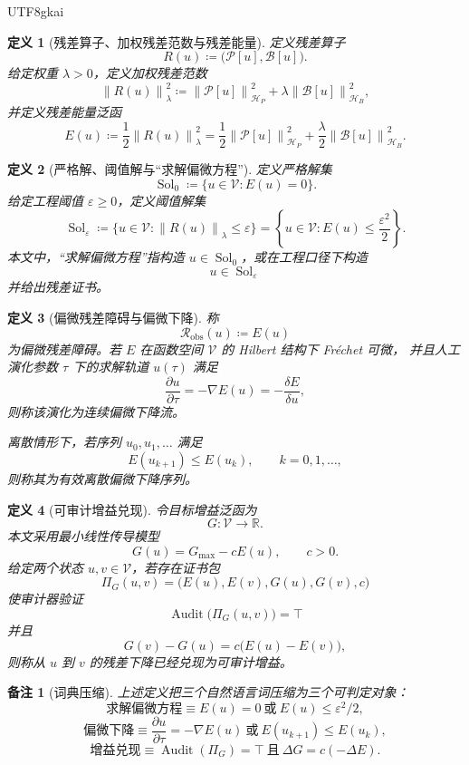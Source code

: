 \documentclass[12pt]{article}
\newtheorem{definition}{定义}[section]
\newtheorem{remark}{备注}[section]
\newcommand{\RR}{\mathbb{R}}
\newcommand{\DefEq}{\coloneqq}
\newcommand{\Pcal}{\mathcal P}
\newcommand{\Bcal}{\mathcal B}
\newcommand{\Vcal}{\mathcal V}
\newcommand{\Hcal}{\mathcal H}
\newcommand{\Rcal}{\mathcal R}
\newcommand{\norm}[1]{\left\lVert #1 \right\rVert}
\DeclareMathOperator{\Sol}{Sol}
\DeclareMathOperator{\Audit}{Audit}
\begin{document}
\begin{CJK*}{UTF8}{gkai}
\begin{definition}[残差算子、加权残差范数与残差能量]
\label{def:tex58-residual-energy}
定义残差算子
\[
  R(u)
  \DefEq
  \bigl(\Pcal[u],\Bcal[u]\bigr).
\]
给定权重 \(\lambda>0\)，定义加权残差范数
\[
  \norm{R(u)}_{\lambda}^{2}
  \DefEq
  \norm{\Pcal[u]}_{\Hcal_P}^{2}
  +
  \lambda\norm{\Bcal[u]}_{\Hcal_B}^{2},
\]
并定义残差能量泛函
\[
  E(u)
  \DefEq
  \frac12\norm{R(u)}_{\lambda}^{2}
  =
  \frac12\norm{\Pcal[u]}_{\Hcal_P}^{2}
  +
  \frac{\lambda}{2}\norm{\Bcal[u]}_{\Hcal_B}^{2}.
\]
\end{definition}

\begin{definition}[严格解、阈值解与“求解偏微方程”]
\label{def:tex58-solve-pde}
定义严格解集
\[
  \Sol_0
  \DefEq
  \{u\in\Vcal:E(u)=0\}.
\]
给定工程阈值 \(\varepsilon\ge0\)，定义阈值解集
\[
  \Sol_{\varepsilon}
  \DefEq
  \{u\in\Vcal:\norm{R(u)}_{\lambda}\le\varepsilon\}
  =
  \left\{u\in\Vcal:E(u)\le\frac{\varepsilon^2}{2}\right\}.
\]
本文中，“求解偏微方程”指构造 \(u\in\Sol_0\)，或在工程口径下构造
\[
  u\in\Sol_{\varepsilon}
\]
并给出残差证书。
\end{definition}

\begin{definition}[偏微残差障碍与偏微下降]
\label{def:tex58-pde-descent}
称
\[
  \Rcal_{\mathrm{obs}}(u)\DefEq E(u)
\]
为偏微残差障碍。若 \(E\) 在函数空间 \(\Vcal\) 的 Hilbert 结构下 Fréchet 可微，
并且人工演化参数 \(\tau\) 下的求解轨道 \(u(\tau)\) 满足
\[
  \frac{\partial u}{\partial\tau}
  =
  -\nabla E(u)
  =
  -\frac{\delta E}{\delta u},
\]
则称该演化为连续偏微下降流。

离散情形下，若序列 \(u_0,u_1,\ldots\) 满足
\[
  E(u_{k+1})\le E(u_k),
  \qquad k=0,1,\ldots,
\]
则称其为有效离散偏微下降序列。
\end{definition}

\begin{definition}[可审计增益兑现]
\label{def:tex58-gain-realization}
令目标增益泛函为
\[
  G:\Vcal\to\RR.
\]
本文采用最小线性传导模型
\[
  G(u)=G_{\max}-cE(u),
  \qquad c>0.
\]
给定两个状态 \(u,v\in\Vcal\)，若存在证书包
\[
  \Pi_G(u,v)
  =
  \bigl(E(u),E(v),G(u),G(v),c\bigr)
\]
使审计器验证
\[
  \Audit\bigl(\Pi_G(u,v)\bigr)=\top
\]
并且
\[
  G(v)-G(u)=c\bigl(E(u)-E(v)\bigr),
\]
则称从 \(u\) 到 \(v\) 的残差下降已经兑现为可审计增益。
\end{definition}

\begin{remark}[词典压缩]
上述定义把三个自然语言词压缩为三个可判定对象：
\[
  \text{求解偏微方程}
  \equiv
  E(u)=0\ \text{或}\ E(u)\le\varepsilon^2/2,
\]
\[
  \text{偏微下降}
  \equiv
  \frac{\partial u}{\partial\tau}=-\nabla E(u)
  \ \text{或}\
  E(u_{k+1})\le E(u_k),
\]
\[
  \text{增益兑现}
  \equiv
  \Audit(\Pi_G)=\top
  \ \text{且}\
  \Delta G=c(-\Delta E).
\]
\end{remark}


\end{CJK*}
\end{document}
